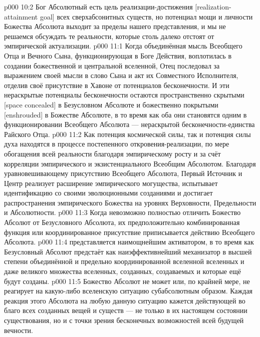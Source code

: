 \vs p000 10:2 Бог Абсолютный есть цель реализации\hyp{}достижения [realization\hyp{}attainment goal] всех сверхабсонитных существ, но потенциал мощи и личности Божества Абсолюта выходит за пределы нашего представления, и мы не решаемся обсуждать те реальности, которые столь далеко отстоят от эмпирической актуализации.
\vs p000 11:1 Когда объединённая мысль Всеобщего Отца и Вечного Сына, функционирующая в Боге Действия, воплотилась в создании божественной и центральной вселенной, Отец последовал за выражением своей мысли в слово Сына и акт их Совместного Исполнителя, отделив своё присутствие в Хавоне от потенциалов бесконечности. И эти нераскрытые потенциалы бесконечности остаются пространственно скрытыми [space concealed] в Безусловном Абсолюте и божественно покрытыми [enshrouded] в Божестве Абсолюте, в то время как оба они становятся одним в функционировании Всеобщего Абсолюта --- нераскрытой бесконечности\hyp{}единства Райского Отца.
\vs p000 11:2 Как потенция космической силы, так и потенция силы духа находятся в процессе постепенного откровения\hyp{}реализации, по мере обогащения всей реальности благодаря эмпирическому росту и за счёт корреляции эмпирического и экзистенциального Всеобщим Абсолютом. Благодаря уравновешивающему присутствию Всеобщего Абсолюта, Первый Источник и Центр реализует расширение эмпирического могущества, испытывает идентификацию со своими эволюционными созданиями и достигает распространения эмпирического Божества на уровнях Верховности, Предельности и Абсолютности.
\vs p000 11:3 \pc Когда невозможно полностью отличить Божество Абсолют от Безусловного Абсолюта, их предположительно комбинированная функция или координированное присутствие приписывается действию Всеобщего Абсолюта.
\vs p000 11:4 \pc {}\bibnobreakspace {} представляется наимощнейшим активатором, в то время как Безусловный Абсолют предстаёт как наиэффективнейший механизатор в высшей степени объединённой и предельно координированной вселенной вселенных и даже великого множества вселенных, созданных, создаваемых и которые ещё будут созданы.
\vs p000 11:5 Божество Абсолют не может или, по крайней мере, не реагирует на какую\hyp{}либо вселенскую ситуацию субабсолютным образом. Каждая реакция этого Абсолюта на любую данную ситуацию кажется действующей во благо всех созданных вещей и существ --- не только в их настоящем состоянии существования, но и с точки зрения бесконечных возможностей всей будущей вечности.

